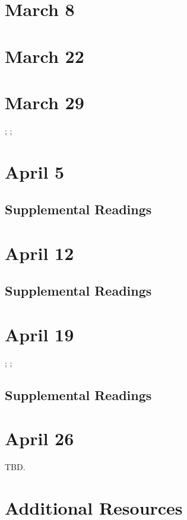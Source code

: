 \documentclass[11pt]{article}
\begin{document}
\section{March 8}

\cite{Hayles:2008wq}


\section{March 22}

\cite{Pascoe:2011cj}

\section{March 29}

\cite{Cohn:1993wq}; \cite{Nafus:2012gg}; \cite{Reagle:2012vr}


\section{April 5 }

\cite{Cassell:2000vw}

\subsection{Supplemental Readings}
\cite{Burrill2008}

\section{April 12}

\cite{Kafai:2008wl}

\subsection{Supplemental Readings}
\cite{Shaw:2015dr}


\section{April 19}

\cite{Gaboury:2015uv}; \cite{Nooney:2013vu}; \cite{Wu:2007gs}

\subsection{Supplemental Readings}
\cite{Ruberg:2017ww}

\section{April 26}

TBD.

\newpage
\section{Additional Resources}
\nocite{*} 
\printbibliography
\end{document}
